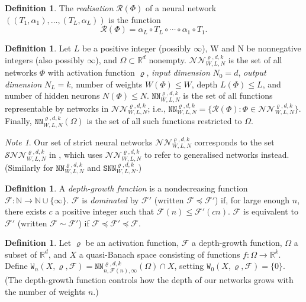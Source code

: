 \documentclass{article}
\theoremstyle{definition}
\newtheorem{definition}[theorem]{Definition}
\theoremstyle{remark}
\newtheorem*{note}{Note}
\begin{document}
\begin{definition}
    The \textit{realisation} $\mathcal{R}(\Phi)$ of a neural network $((T_1,\alpha_1),\ldots,(T_L,\alpha_L))$ is the function
    \[\mathcal{R}(\Phi) = \alpha_L \circ T_L \circ \cdots \circ \alpha_1 \circ T_1.\]
\end{definition}

\begin{definition}
    Let $L$ be a positive integer (possibly $\infty$), W and N be nonnegative integers (also possibly $\infty$), and $\Omega \subset \mathbb{R}^d$ nonempty. $\mathcal{NN}_{W,L,N}^{\varrho,d,k}$ is the set of all networks $\Phi$ with activation function $\varrho$, \textit{input dimension} $N_0 = d$, \textit{output dimension} $N_L = k$, number of weights $W(\Phi) \leq W$, depth $L(\Phi) \leq L$, and number of hidden neurons $N(\Phi) \leq N$. $\mathtt{NN}_{W,L,N}^{\varrho,d,k}$ is the set of all functions representable by networks in $\mathcal{NN}_{W,L,N}^{\varrho,d,k}$; i.e., $\mathtt{NN}_{W,L,N}^{\varrho,d,k} = \{ \mathcal{R}(\Phi): \Phi \in \mathcal{NN}_{W,L,N}^{\varrho,d,k} \}$. Finally, $\mathtt{NN}_{W,L,N}^{\varrho,d,k}(\Omega)$ is the set of all such functions restricted to $\Omega$.
\end{definition}

\begin{note}
    Our set of strict neural networks $\mathcal{NN}_{W,L,N}^{\varrho,d,k}$ corresponds to the set $\mathcal{SNN}_{W,L,N}^{\varrho,d,k}$ in \cite{gribonval_approximation_2022}, which uses $\mathcal{NN}_{W,L,N}^{\varrho,d,k}$ to refer to generalised networks instead. (Similarly for $\mathtt{NN}_{W,L,N}^{\varrho,d,k}$ and $\mathtt{SNN}_{W,L,N}^{\varrho,d,k}$.)
\end{note}

\begin{definition}
    A \textit{depth-growth function} is a nondecreasing function $\mathcal{F}: \mathbb{N} \to \mathbb{N} \cup \{ \infty \}$. $\mathcal{F}$ is \textit{dominated} by $\mathcal{F}'$ (written $\mathcal{F} \preceq \mathcal{F}'$) if, for large enough $n$, there exists $c$ a positive integer such that $\mathcal{F}(n) \leq \mathcal{F}'(cn)$. $\mathcal{F}$ is equivalent to $\mathcal{F}'$ (written $\mathcal{F} \sim \mathcal{F}'$) if $\mathcal{F} \preceq \mathcal{F}' \preceq \mathcal{F}$.
\end{definition}

\begin{definition}
    Let $\varrho$ be an activation function, $\mathcal{F}$ a depth-growth function, $\Omega$ a subset of $\mathbb{R}^d$, and $X$ a quasi-Banach space consisting of functions $f: \Omega \to \mathbb{R}^k$. Define $\mathtt{W}_n(X,\varrho,\mathcal{F}) = \mathtt{NN}_{n,\mathcal{F}(n),\infty}^{\varrho,d,k}(\Omega) \cap X$, setting $\mathtt{W}_0(X,\varrho,\mathcal{F}) = \{ 0 \}$. (The depth-growth function controls how the depth of our networks grows with the number of weights $n$.)
\end{definition}
\end{document}
